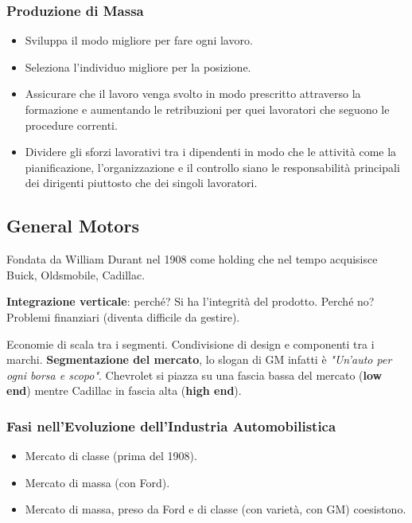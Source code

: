 \documentclass[a4paper,portrait,12pt]{article}
\theoremstyle{definition}
\begin{document}
\subsubsection{Produzione di Massa}
\begin{itemize}
\item Sviluppa il modo migliore per fare ogni lavoro.
\item Seleziona l'individuo migliore per la posizione.
\item Assicurare che il lavoro venga svolto in modo prescritto attraverso la formazione e aumentando le retribuzioni per quei lavoratori che seguono le procedure correnti.
\item Dividere gli sforzi lavorativi tra i dipendenti in modo che le attività come la pianificazione, l'organizzazione e il controllo siano le responsabilità principali dei dirigenti piuttosto che dei singoli lavoratori.
\end{itemize}

\subsection{General Motors}

Fondata da William Durant nel 1908 come holding che nel tempo acquisisce Buick, Oldsmobile, Cadillac.

\textbf{Integrazione verticale}: perché? Si ha l'integrità del prodotto.
Perché no? Problemi finanziari (diventa difficile da gestire).

Economie di scala tra i segmenti.
Condivisione di design e componenti tra i marchi.
\textbf{Segmentazione del mercato}, lo slogan di GM infatti è
\emph{"Un'auto per ogni borsa e scopo"}.
Chevrolet si piazza su una fascia bassa del mercato (\textbf{low end}) mentre Cadillac in fascia alta (\textbf{high end}).


\subsubsection{Fasi nell'Evoluzione dell'Industria Automobilistica}
\begin{itemize}
\item Mercato di classe (prima del 1908).
\item Mercato di massa (con Ford).
\item Mercato di massa, preso da Ford e di classe (con varietà, con GM) coesistono.
\end{itemize}
\end{document}
